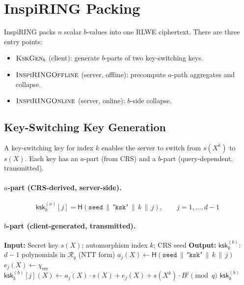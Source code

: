 \documentclass[11pt,a4paper]{article}
\newcommand{\R}{\mathcal{R}}
\newcommand{\Rq}{\R_{q}}
\begin{document}
\section{InspiRING Packing}\label{sec:packing}

InspiRING packs $n$ scalar $b$-values into one RLWE ciphertext.
There are three entry points:
\begin{itemize}[nosep]
    \item $\textsc{KskGen}_b$ (client): generate $b$-parts of two key-switching keys.
    \item $\textsc{InspiRINGOffline}$ (server, offline): precompute $a$-path aggregates and collapse.
    \item $\textsc{InspiRINGOnline}$ (server, online): $b$-side collapse.
\end{itemize}

\subsection{Key-Switching Key Generation}\label{sec:packing-keys}

A key-switching key for index $k$ enables the server to switch from $s(X^k)$ to $s(X)$.
Each key has an $a$-part (from CRS) and a $b$-part (query-dependent, transmitted).

\paragraph{$a$-part (CRS-derived, server-side).}
\begin{equation}
    \mathsf{ksk}_k^{(a)}[j] = \mathsf{H}(\texttt{seed} \,\|\, \texttt{"ksk"} \,\|\, k \,\|\, j), \qquad j = 1, \ldots, d-1
    \label{eq:ksk-a}
\end{equation}

\paragraph{$b$-part (client-generated, transmitted).}
\begin{algorithm}[H]
\caption{$\textsc{KskGen}_b(s(X), k, \texttt{seed})$: Generate key-switching key $b$-part.}
\label{alg:ksk-gen}
\begin{algorithmic}[1]
\State \textbf{Input:} Secret key $s(X)$; automorphism index $k$; CRS seed
\State \textbf{Output:} $\mathsf{ksk}_k^{(b)}$: $d\!-\!1$ polynomials in $\Rq$ (NTT form)
 
    \State $a_j(X) \gets \mathsf{H}(\texttt{seed} \,\|\, \texttt{"ksk"} \,\|\, k \,\|\, j)$ 
    \State $e_j(X) \gets \chi_{\mathrm{err}}$
    \State $\mathsf{ksk}_k^{(b)}[j](X) \gets a_j(X) \cdot s(X) + e_j(X) + s(X^k) \cdot B^j \pmod{q}$ 
\EndFor
\State \Return $\mathsf{ksk}_k^{(b)}$ 
\end{algorithmic}
\end{algorithm}
\end{document}
